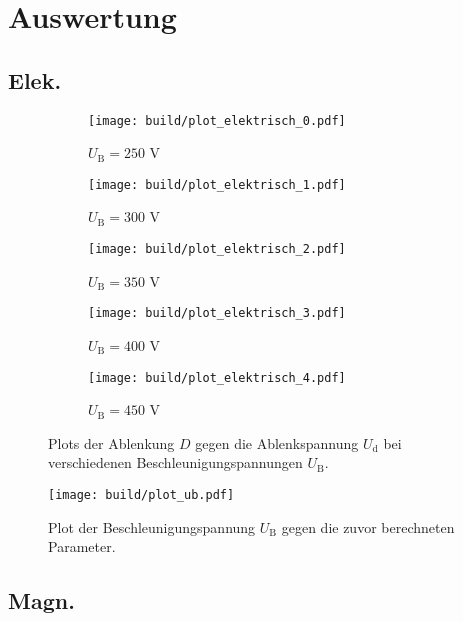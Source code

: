 \section{Auswertung}
\label{sec:Auswertung}

\subsection{Elek.}



\begin{figure}
  \centering
  \begin{subfigure}{0.49\textwidth}
    \centering
    \texttt{[image: build/plot\_elektrisch\_0.pdf]}
    \caption{$U_\text{B} = 250$ V}
  \end{subfigure}
  \begin{subfigure}{0.49\textwidth}
    \centering
    \texttt{[image: build/plot\_elektrisch\_1.pdf]}
    \caption{$U_\text{B} = 300$ V}
  \end{subfigure}

  \begin{subfigure}{0.49\textwidth}
    \centering
    \texttt{[image: build/plot\_elektrisch\_2.pdf]}
    \caption{$U_\text{B} = 350$ V}
  \end{subfigure}
  \begin{subfigure}{0.49\textwidth}
    \centering
    \texttt{[image: build/plot\_elektrisch\_3.pdf]}
    \caption{$U_\text{B} = 400$ V}
  \end{subfigure}

  \begin{subfigure}{0.49\textwidth}
    \centering
    \texttt{[image: build/plot\_elektrisch\_4.pdf]}
    \caption{$U_\text{B} = 450$ V}
  \end{subfigure}
  \caption{Plots der Ablenkung $D$ gegen die Ablenkspannung $U_\text{d}$ bei verschiedenen Beschleunigungspannungen $U_\text{B}$.}
  \label{fig:plot-elektrisch}
\end{figure}

\begin{figure}
  \centering
  \texttt{[image: build/plot\_ub.pdf]}
  \caption{Plot der Beschleunigungspannung $U_\text{B}$ gegen die zuvor berechneten Parameter.}
  \label{fig:plt-ub}
\end{figure}




\subsection{Magn.}

